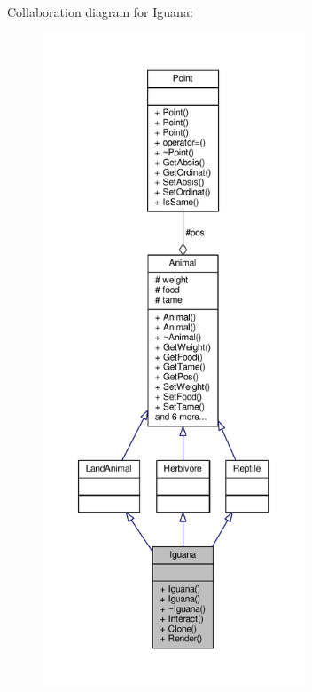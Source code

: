 Collaboration diagram for Iguana\+:
\nopagebreak
\begin{figure}[H]
\begin{center}
\leavevmode
\includegraphics[height=550pt]{classIguana__coll__graph}
\end{center}
\end{figure}
